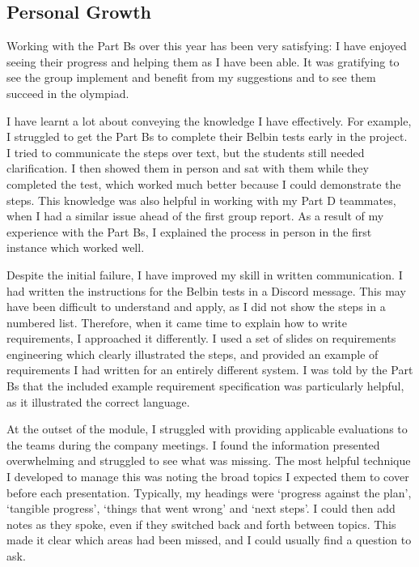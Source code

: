     \subsection{Personal Growth}\label{subsec:reflection-personal}
        Working with the Part Bs over this year has been very satisfying: I have enjoyed seeing their progress and helping them as I have been able.
        It was gratifying to see the group implement and benefit from my suggestions and to see them succeed in the olympiad.

        I have learnt a lot about conveying the knowledge I have effectively.
        For example, I struggled to get the Part Bs to complete their Belbin tests early in the project.
        I tried to communicate the steps over text, but the students still needed clarification.
        I then showed them in person and sat with them while they completed the test, which worked much better because I could demonstrate the steps.
        This knowledge was also helpful in working with my Part D teammates, when I had a similar issue ahead of the first group report.
        As a result of my experience with the Part Bs, I explained the process in person in the first instance which worked well.

        Despite the initial failure, I have improved my skill in written communication.
        I had written the instructions for the Belbin tests in a Discord message. %
        This may have been difficult to understand and apply, as I did not show the steps in a numbered list.
        Therefore, when it came time to explain how to write requirements, I approached it differently.
        I used a set of slides on requirements engineering which clearly illustrated the steps, and provided an example of requirements I had written for an entirely different system.
        I was told by the Part Bs that the included example requirement specification was particularly helpful, as it illustrated the correct language.

        At the outset of the module, I struggled with providing applicable evaluations to the teams during the company meetings.
        I found the information presented overwhelming and struggled to see what was missing.
        The most helpful technique I developed to manage this was noting the broad topics I expected them to cover before each presentation.
        Typically, my headings were `progress against the plan', `tangible progress', `things that went wrong' and `next steps'.
        I could then add notes as they spoke, even if they switched back and forth between topics. %
        This made it clear which areas had been missed, and I could usually find a question to ask.

